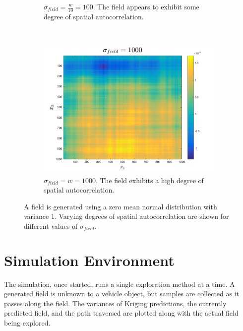 \begin{figure}[ht!]
\begin{subfigure}[t]{0.33333\textwidth}
        \caption{$\sigma_{field} = \frac{w}{10} = 100$. The field appears to exhibit some degree of spatial autocorrelation.}
    \end{subfigure}%
    ~ 
    \begin{subfigure}[t]{0.33333\textwidth}
        \centering
        \includegraphics[width=\linewidth]{figures/autocorr_sigma_1000.png}
		\captionsetup{skip=0.25\baselineskip,size=footnotesize}
		\ssp
        \caption{$\sigma_{field} = w = 1000$. The field exhibits a high degree of spatial autocorrelation.}
    \end{subfigure}
    \ssp
    \caption{A field is generated using a zero mean normal distribution with variance $1$. Varying degrees of spatial autocorrelation are shown for different values of $\sigma_{field}$.}
\end{figure}

\section{Simulation Environment}
The simulation, once started, runs a single exploration method at a time. A generated field is unknown to a vehicle object, but samples are collected as it passes along the field. The variances of Kriging predictions, the currently predicted field, and the path traversed are plotted along with the actual field being explored.

